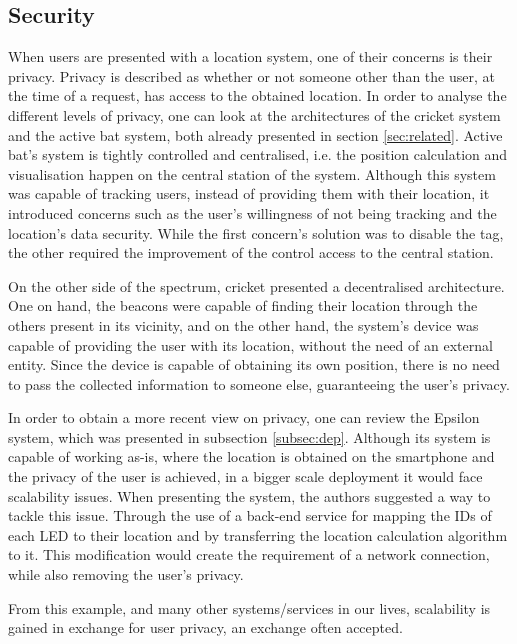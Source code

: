  
 
 
\subsection{Security} 
\label{subsec:sec} 
 
 
When users are presented with a location system, one of their concerns is their privacy. Privacy is described as whether or not someone other than the user, at the time of a request, has access to the obtained location. In order to analyse the different levels of privacy, one can look at the architectures of the cricket system and the active bat system, both already presented in section \ref{sec:related}. Active bat's system is tightly controlled and centralised, i.e. the position calculation and visualisation happen on the central station of the system. Although this system was capable of tracking users, instead of providing them with their location, it introduced concerns such as the user's willingness of not being tracking and the location's data security. While the first concern's solution was to disable the tag, the other required the improvement of the control access to the central station. 
 
 
On the other side of the spectrum, cricket presented a decentralised architecture. One on hand, the beacons were capable of finding their location through the others present in its vicinity, and on the other hand, the system's device was capable of providing the user with its location, without the need of an external entity. Since the device is capable of obtaining its own position, there is no need to pass the collected information to someone else, guaranteeing the user's privacy.  
 
 
In order to obtain a more recent view on privacy, one can review the Epsilon system, which was presented in subsection \ref{subsec:dep}. Although its system is capable of working as-is, where the location is obtained on the smartphone and the privacy of the user is achieved, in a bigger scale deployment it would face scalability issues. When presenting the system, the authors suggested a way to tackle this issue. Through the use of a back-end service for mapping the IDs of each LED to their location and by transferring the location calculation algorithm to it. This modification would create the requirement of a network connection, while also removing the user's privacy.  
 
 
From this example, and many other systems/services in our lives, scalability is gained in exchange for user privacy, an exchange often accepted. 